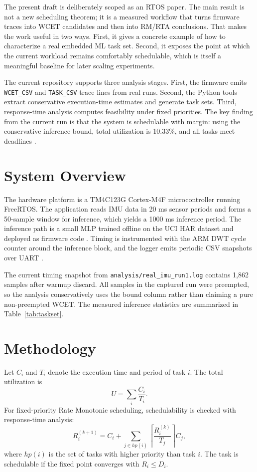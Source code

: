 \documentclass[journal]{IEEEtran}
\begin{document}
The present draft is deliberately scoped as an RTOS paper. The main result is not a new scheduling theorem; it is a measured workflow that turns firmware traces into WCET candidates and then into RM/RTA conclusions. That makes the work useful in two ways. First, it gives a concrete example of how to characterize a real embedded ML task set. Second, it exposes the point at which the current workload remains comfortably schedulable, which is itself a meaningful baseline for later scaling experiments.

The current repository supports three analysis stages. First, the firmware emits \texttt{WCET\_CSV} and \texttt{TASK\_CSV} trace lines from real runs. Second, the Python tools extract conservative execution-time estimates and generate task sets. Third, response-time analysis computes feasibility under fixed priorities. The key finding from the current run is that the system is schedulable with margin: using the conservative inference bound, total utilization is 10.33\%, and all tasks meet deadlines \cite{liu1973}.

\section{System Overview}
The hardware platform is a TM4C123G Cortex-M4F microcontroller running FreeRTOS. The application reads IMU data in 20 ms sensor periods and forms a 50-sample window for inference, which yields a 1000 ms inference period. The inference path is a small MLP trained offline on the UCI HAR dataset and deployed as firmware code \cite{anguita2013}. Timing is instrumented with the ARM DWT cycle counter around the inference block, and the logger emits periodic CSV snapshots over UART \cite{freertos}.

The current timing snapshot from \texttt{analysis/real\_imu\_run1.log} contains 1,862 samples after warmup discard. All samples in the captured run were preempted, so the analysis conservatively uses the bound column rather than claiming a pure non-preempted WCET. The measured inference statistics are summarized in Table~\ref{tab:taskset}.

\section{Methodology}
Let $C_i$ and $T_i$ denote the execution time and period of task $i$. The total utilization is
\begin{equation}
U = \sum_i \frac{C_i}{T_i}.
\end{equation}
For fixed-priority Rate Monotonic scheduling, schedulability is checked with response-time analysis:
\begin{equation}
R_i^{(k+1)} = C_i + \sum_{j \in hp(i)} \left\lceil \frac{R_i^{(k)}}{T_j} \right\rceil C_j,
\end{equation}
where $hp(i)$ is the set of tasks with higher priority than task $i$. The task is schedulable if the fixed point converges with $R_i \le D_i$.
\end{document}
